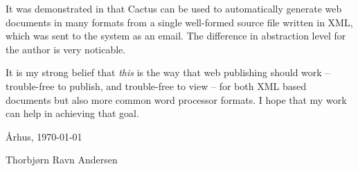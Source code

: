 It was demonstrated in  that Cactus can be
used to automatically generate web documents in many formats from a
single well-formed source file written in XML, which was sent to the
system as an email.   The difference in abstraction level for the
author is very noticable.

It is my strong belief that \textit{this} is the way that web
publishing should work -- trouble-free to publish, and trouble-free to
view -- for both XML based documents but also more common word
processor formats.  I hope that my work can help in achieving that
goal.




\begin{center}

\vspace{2cm}

{\AA}rhus, \today

\vspace{2cm}
Thorbj{\o}rn Ravn Andersen

\end{center}


